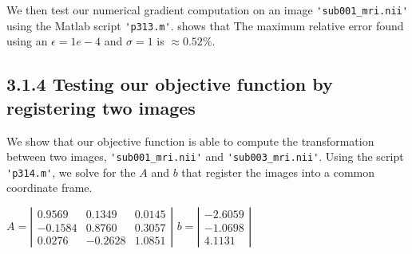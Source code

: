 \documentclass{article}
\begin{document}
\begin{par}
			We then test our numerical gradient computation on an image \lstinline|'sub001_mri.nii'| using the Matlab script \lstinline|'p313.m'|. shows that The maximum relative error found using an $\epsilon = 1e-4$ and $\sigma = 1$ is  $\approx 0.52\%$.
			
%			
		
		\subsection*{3.1.4 Testing our objective function by registering two images}
		We show that our objective function is able to compute the transformation between two images, \lstinline|'sub001_mri.nii'| and \lstinline|'sub003_mri.nii'|. Using the script \lstinline|'p314.m'|, we solve for the $A$ and $b$ that register the images into a common coordinate frame. \\
		
		\begin{center}
		$ A = \left| \begin{array}{ccc}
				 0.9569 & 0.1349 & 0.0145 \\
				 -0.1584 & 0.8760 & 0.3057 \\ 
				 0.0276 & -0.2628 & 1.0851 \end{array} \right| $
		$ b = \left| \begin{array}{c}
			-2.6059 \\
			-1.0698 \\
			4.1131 \end{array} \right| $		
		\end{center}


\end{par}
\end{document}
